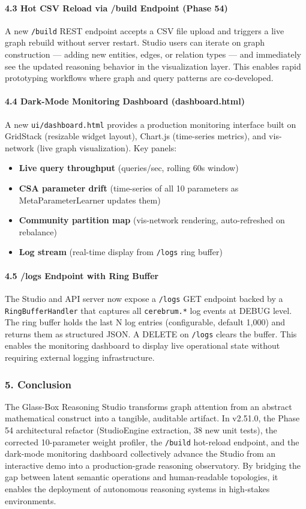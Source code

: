 \paragraph{4.3 Hot CSV Reload via /build Endpoint (Phase 54)}
A new \texttt{/build} REST endpoint accepts a CSV file upload and triggers a live graph rebuild without server restart. Studio users can iterate on graph const\-ruction — adding new entities, edges, or relation types — and immediately see the updated reasoning behavior in the visua\-lization layer. This enables rapid prototyping workflows where graph and query patterns are co-developed.

\paragraph{4.4 Dark-Mode Monitoring Dashboard (dashboard.html)}
A new \texttt{ui/dashboard.html} provides a production monitoring interface built on GridStack (resizable widget layout), Chart.js (time-series metrics), and vis-network (live graph visua\-lization). Key panels:
\begin{itemize}
\item \textbf{Live query throughput} (queries/sec, rolling 60s window)
\item \textbf{CSA parameter drift} (time-series of all 10 parameters as MetaParameterLearner updates them)
\item \textbf{Community partition map} (vis-network rendering, auto-refreshed on rebalance)
\item \textbf{Log stream} (real-time display from \texttt{/logs} ring buffer)

\end{itemize}
\paragraph{4.5 /logs Endpoint with Ring Buffer}
The Studio and API server now expose a \texttt{/logs} GET endpoint backed by a \texttt{RingBufferHandler} that captures all \texttt{cerebrum.*} log events at DEBUG level. The ring buffer holds the last N log entries (confi\-gurable, default 1,000) and returns them as structured JSON. A DELETE on \texttt{/logs} clears the buffer. This enables the monitoring dashboard to display live operational state without requiring external logging infra\-structure.

\subsubsection{5. Conclusion}
The Glass-Box Reasoning Studio transforms graph attention from an abstract mathe\-matical construct into a tangible, auditable artifact. In v2.51.0, the Phase 54 archi\-tectural refactor (StudioEngine extraction, 38 new unit tests), the corrected 10-parameter weight profiler, the \texttt{/build} hot-reload endpoint, and the dark-mode monitoring dashboard colle\-ctively advance the Studio from an interactive demo into a production-grade reasoning observatory. By bridging the gap between latent semantic operations and human-readable topologies, it enables the deployment of autonomous reasoning systems in high-stakes envir\-onments.

